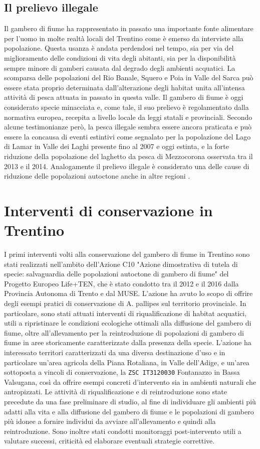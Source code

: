 \documentclass[11pt,a4paper,italian,twoside,openany]{memoir}
\begin{document}
\subsection{Il prelievo illegale}
Il gambero di fiume ha rappresentato in passato una importante fonte alimentare per l'uomo in molte realtà locali del Trentino come è emerso da interviste alla popolazione. Questa usanza è andata perdendosi nel tempo, sia per via del miglioramento delle condizioni di vita degli abitanti, sia per la disponibilità sempre minore di gamberi causata dal degrado degli ambienti acquatici. La scomparsa delle popolazioni del Rio Banale, Squero e Poia in Valle del Sarca può essere stata proprio determinata dall'alterazione degli habitat unita all'intensa attività di pesca attuata in passato in questa valle. Il gambero di fiume è oggi considerato specie minacciata e, come tale, il suo prelievo è regolamentato dalla normativa europea, recepita a livello locale da leggi statali e provinciali. Secondo alcune testimonianze però, la pesca illegale sembra essere ancora praticata e può essere la concausa di eventi estintivi come segnalato per la popolazione del Lago di Lamar in Valle dei Laghi presente fino al 2007 e oggi estinta, e la forte riduzione della popolazione del laghetto da pesca di Mezzocorona osservata tra il 2013 e il 2014. Analogamente il prelievo illegale è considerato una delle cause di riduzione delle popolazioni autoctone anche in altre regioni \cite{Aquiloni 2010}.

\section{Interventi di conservazione in Trentino}
I primi interventi volti alla conservazione del gambero di fiume in Trentino sono stati realizzati nell'ambito dell'Azione C10 "Azione dimostrativa di tutela di specie: salvaguardia delle popolazioni autoctone di gambero di fiume" del Progetto Europeo Life+TEN, che è stato condotto tra il 2012 e il 2016 dalla Provincia Autonoma di Trento e dal MUSE. L'azione ha avuto lo scopo di offrire degli esempi pratici di conservazione di A. pallipes sul territorio provinciale. In particolare, sono stati attuati interventi di riqualificazione di habitat acquatici, utili a ripristinare le condizioni ecologiche ottimali alla diffusione del gambero di fiume, oltre all'allevamento per la reintroduzione di popolazioni di gambero di fiume in aree storicamente caratterizzate dalla presenza della specie. L'azione ha interessato territori caratterizzati da una diversa destinazione d'uso e in particolare un'area agricola della Piana Rotaliana, in Valle dell'Adige, e un'area sottoposta a vincoli di conservazione, la \texttt{ZSC IT3120030} Fontanazzo in Bassa Valsugana, così da offrire esempi concreti d'intervento sia in ambienti naturali che antropizzati. Le attività di riqualificazione e di reintroduzione sono state precedute da una fase preliminare di studio, al fine di individuare gli ambienti più adatti alla vita e alla diffusione del gambero di fiume e le popolazioni di gambero più idonee a fornire individui da avviare all'allevamento e quindi alla reintroduzione. Sono inoltre stati condotti monitoraggi post-intervento utili a valutare successi, criticità ed elaborare eventuali strategie correttive.
\end{document}
